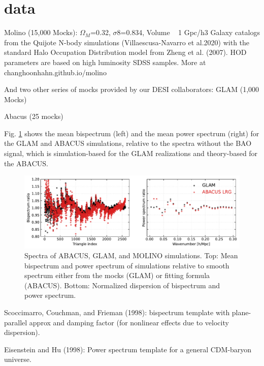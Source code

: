 \section{data}\label{sec:data}
Molino (15,000 Mocks): 
$\Omega_{Μ}$=0.32, $\sigma$8=0.834,  Volume ~ 1 Gpc/h3 
Galaxy catalogs from the Quijote N-body simulations (Villaescusa-Navarro et al.2020) with the standard Halo Occupation Distribution model from Zheng et al. (2007). HOD parameters are based on high luminosity SDSS samples. More at changhoonhahn.github.io/molino

And two other series of mocks provided by our DESI collaborators:
GLAM (1,000 Mocks)

Abacus (25 mocks)


Fig. \ref{fig:data} shows the mean bispectrum (left) and the mean power spectrum (right) for the GLAM and ABACUS simulations, relative to the spectra without the BAO signal, which is simulation-based for the GLAM realizations and theory-based for the ABACUS.

\begin{figure}
\includegraphics[width=\textwidth]{figures/spectra.pdf}
\caption{Spectra of ABACUS, GLAM, and MOLINO simulations. Top: Mean bispectrum and power spectrum of simulations relative to smooth spectrum either from the mocks (GLAM) or fitting formula (ABACUS). Bottom: Normalized dispersion of bispectrum and power spectrum.}\label{fig:data}
\end{figure}




Scoccimarro, Couchman, and Frieman (1998): bispectrum template with plane-parallel approx and damping factor (for nonlinear effects due to velocity dispersion).



Eisenstein and Hu (1998): Power spectrum template for a general CDM-baryon universe.
